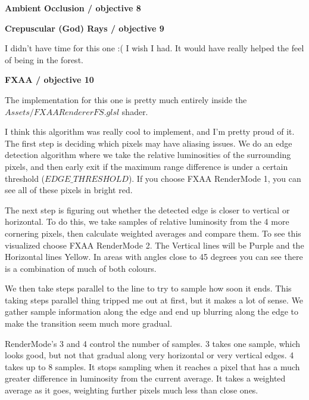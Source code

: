 \documentclass[10pt]{article}
\begin{document}
	\begin{center}
		\bf Ambient Occlusion / objective 8
	\end{center}
	
	\begin{center}
		\bf Crepuscular (God) Rays / objective 9
	\end{center}
	
	I didn't have time for this one :( I wish I had. It would have really helped the feel of being in the forest. 
	
	\begin{center}
		\bf FXAA / objective 10
	\end{center}
	
	The implementation for this one is pretty much entirely inside the $Assets/FXAARendererFS.glsl$ shader.
	
	I think this algorithm was really cool to implement, and I'm pretty proud of it. The first step is deciding which pixels may have aliasing issues. We do an edge detection algorithm where we take the relative luminosities of the surrounding pixels, and then early exit if the maximum range difference is under a certain threshold ($EDGE\_THRESHOLD$). If you choose FXAA RenderMode 1, you can see all of these pixels in bright red.
	
	The next step is figuring out whether the detected edge is closer to vertical or horizontal. To do this, we take samples of relative luminosity from the 4 more cornering pixels, then calculate weighted averages and compare them. To see this visualized choose FXAA RenderMode 2. The Vertical lines will be Purple and the Horizontal lines Yellow. In areas with angles close to 45 degrees you can see there is a combination of much of both colours.
	
	We then take steps parallel to the line to try to sample how soon it ends. This taking steps parallel thing tripped me out at first, but it makes a lot of sense. We gather sample information along the edge and end up blurring along the edge to make the transition seem much more gradual.
	
	RenderMode's 3 and 4 control the number of samples. 3 takes one sample, which looks good, but not that gradual along very horizontal or very vertical edges. 4 takes up to 8 samples. It stops sampling when it reaches a pixel that has a much greater difference in luminosity from the current average. It takes a weighted average as it goes, weighting further pixels much less than close ones.
\end{document}
